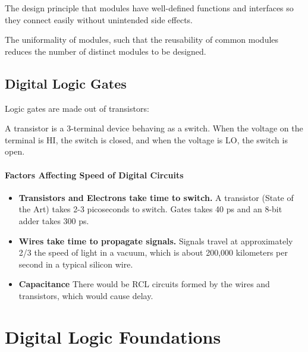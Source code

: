 \documentclass[11pt]{report}
\begin{document}
\begin{shaded}
\begin{definition}[Modularity]
    The design principle that modules have well-defined functions and interfaces so they connect easily without unintended side effects.
\end{definition}

\begin{definition}[Regularity]
    The uniformality of modules, such that the reusability of common modules reduces the number of distinct modules to be designed.
\end{definition}

\subsection{Digital Logic Gates}
Logic gates are made out of transistors:
\begin{definition}[Transistor]
    A transistor is a 3-terminal device behaving as a switch. When the voltage on the terminal is HI, the switch is closed, and when the voltage is LO, the switch is open.
\end{definition}

\paragraph{Factors Affecting Speed of Digital Circuits}
\begin{itemize}
    \item \textbf{Transistors and Electrons take time to switch.} A transistor (State of the Art) takes 2-3 picoseconds to switch. Gates takes 40 ps and an 8-bit adder takes 300 ps.
    \item \textbf{Wires take time to propagate signals.} Signals travel at approximately 2/3 the speed of light in a vacuum, which is about 200,000 kilometers per second in a typical silicon wire.
    \item \textbf{Capacitance} There would be RCL circuits formed by the wires and transistors, which would cause delay.
\end{itemize}

\end{shaded}

\section{Digital Logic Foundations}
\end{document}
